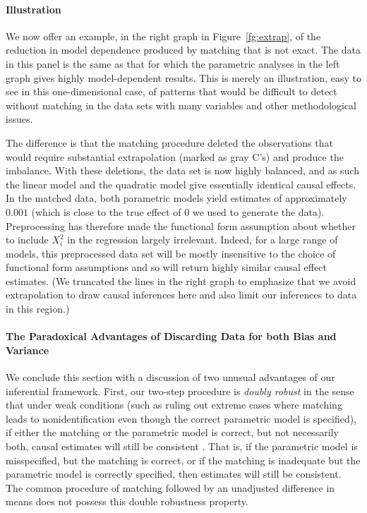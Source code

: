 \documentclass[11pt,titlepage]{article}
\begin{document}
\paragraph{Illustration}
We now offer an example, in the right graph in Figure~\ref{fg:extrap},
of the reduction in model dependence produced by matching that is not
exact.  The data in this panel is the same as that for which the
parametric analyses in the left graph gives highly model-dependent
results.  This is merely an illustration, easy to see in this
one-dimensional case, of patterns that would be difficult to detect
without matching in the data sets with many variables and other
methodological issues.

The difference is that the matching procedure deleted the observations
that would require substantial extrapolation (marked as gray C's) and
produce the imbalance.  With these deletions, the data set is now
highly balanced, and as such the linear model and the quadratic model
give essentially identical causal effects.  In the matched data, both
parametric models yield estimates of approximately $0.001$ (which is
close to the true effect of $0$ we used to generate the data).
Preprocessing has therefore made the functional form assumption about
whether to include $X_i^2$ in the regression largely irrelevant.
Indeed, for a large range of models, this preprocessed data set will
be mostly insensitive to the choice of functional form assumptions and
so will return highly similar causal effect estimates.  (We truncated
the lines in the right graph to emphasize that we avoid extrapolation
to draw causal inferences here and also limit our inferences to data
in this region.)

\paragraph{The Paradoxical Advantages of Discarding Data 
  for both Bias and Variance} We conclude this section with a
discussion of two unusual advantages of our inferential framework.
First, our two-step procedure is \emph{doubly robust} in the sense
that under weak conditions (such as ruling out extreme cases where
matching leads to nonidentification even though the correct parametric
model is specified), if either the matching or the parametric model is
correct, but not necessarily both, causal estimates will still be
consistent \citep[see][]{RobRot01}.  That is, if the parametric model
is misspecified, but the matching is correct, or if the matching is
inadequate but the parametric model is correctly specified, then
estimates will still be consistent.  The common procedure of matching
followed by an unadjusted difference in means does not possess this
double robustness property.
\end{document}
